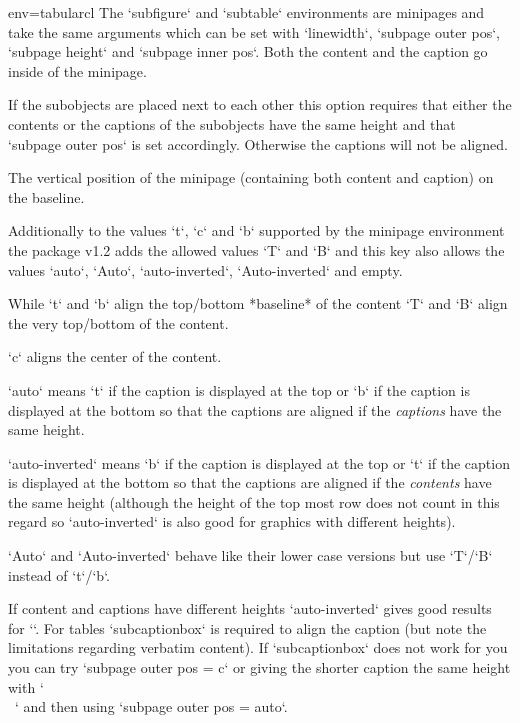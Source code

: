 \begin{tableobject}{env=tabular}{cl}
  The `subfigure` and `subtable` environments are minipages and take the same arguments
  which can be set with `linewidth`, `subpage outer pos`, `subpage height` and `subpage inner pos`.
  Both the content and the caption go inside of the minipage.

  If the subobjects are placed next to each other this option requires that either the contents or the captions of the subobjects have the same height and that `subpage outer pos` is set accordingly.
  Otherwise the captions will not be aligned.

  The vertical position of the minipage (containing both content and caption) on the baseline.

  Additionally to the values `t`, `c` and `b` supported by the minipage environment
  the  package v1.2 adds the allowed values `T` and `B`
  and this key also allows the values `auto`, `Auto`, `auto-inverted`, `Auto-inverted` and empty.

  While `t` and `b` align the top\slash bottom *baseline* of the content
  `T` and `B` align the very top\slash bottom of the content.

  `c` aligns the center of the content.

  `auto` means `t` if the caption is displayed at the top
  or `b` if the caption is displayed at the bottom
  so that the captions are aligned if the \emph{captions} have the same height.

  `auto-inverted` means `b` if the caption is displayed at the top
  or `t` if the caption is displayed at the bottom
  so that the captions are aligned if the \emph{contents} have the same height
  (although the height of the top most row does not count in this regard so `auto-inverted` is also good for graphics with different heights).

  `Auto` and `Auto-inverted` behave like their lower case versions but use `T`/`B` instead of `t`/`b`.

  If content and captions have different heights `auto-inverted` gives good results for ``.
  For tables `subcaptionbox` is required to align the caption (but note the limitations regarding verbatim content).
  If `subcaptionbox` does not work for you you can try `subpage outer pos = c` or giving the shorter caption the same height with `\\~` and then using `subpage outer pos = auto`.


\end{tableobject}
